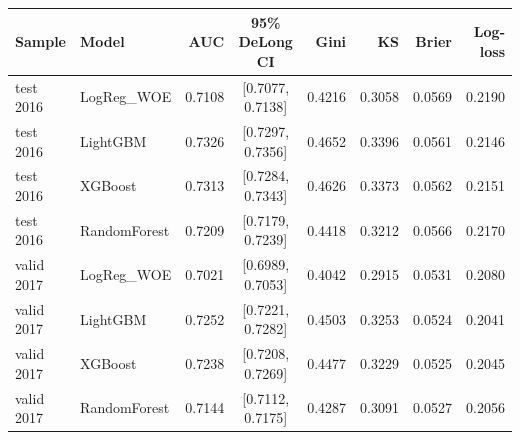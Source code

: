 \begin{tabular}{llrcrrrr}
\toprule
Sample & Model & AUC & 95\% DeLong CI & Gini & KS & Brier & Log-loss \\
\midrule
test 2016 & LogReg\_WOE & 0.7108 & [0.7077, 0.7138] & 0.4216 & 0.3058 & 0.0569 & 0.2190 \\
test 2016 & LightGBM & 0.7326 & [0.7297, 0.7356] & 0.4652 & 0.3396 & 0.0561 & 0.2146 \\
test 2016 & XGBoost & 0.7313 & [0.7284, 0.7343] & 0.4626 & 0.3373 & 0.0562 & 0.2151 \\
test 2016 & RandomForest & 0.7209 & [0.7179, 0.7239] & 0.4418 & 0.3212 & 0.0566 & 0.2170 \\
valid 2017 & LogReg\_WOE & 0.7021 & [0.6989, 0.7053] & 0.4042 & 0.2915 & 0.0531 & 0.2080 \\
valid 2017 & LightGBM & 0.7252 & [0.7221, 0.7282] & 0.4503 & 0.3253 & 0.0524 & 0.2041 \\
valid 2017 & XGBoost & 0.7238 & [0.7208, 0.7269] & 0.4477 & 0.3229 & 0.0525 & 0.2045 \\
valid 2017 & RandomForest & 0.7144 & [0.7112, 0.7175] & 0.4287 & 0.3091 & 0.0527 & 0.2056 \\
\bottomrule
\end{tabular}

